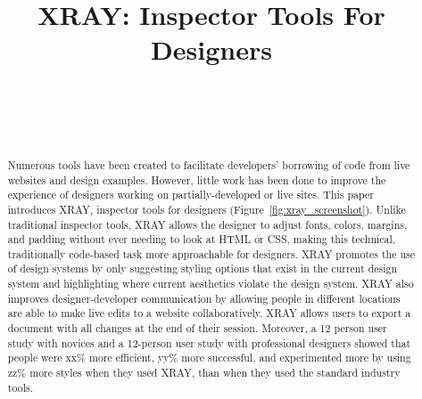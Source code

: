 \documentclass{sigchi}
\newcommand{\xray}{XRAY\xspace}
\def\plaintitle{XRAY: Inspector Tools For Designers}
\begin{document}
\title{\plaintitle}

\author{%
  \\
  \\
  \\
}

\maketitle

\begin{abstract}
Numerous tools have been created to facilitate developers' borrowing of code from live websites and design examples. However, little work has been done to improve the experience of designers working on partially-developed or live sites. This paper introduces \xray, inspector tools for designers (Figure~\ref{fig:xray_screenshot}). Unlike traditional inspector tools, \xray allows the designer to adjust fonts, colors, margins, and padding without ever needing to look at HTML or CSS, making this technical, traditionally code-based task more approachable for designers. \xray promotes the use of design systems by only suggesting styling options that exist in the current design system and highlighting where current aesthetics violate the design system. \xray also improves designer-developer communication by allowing people in different locations are able to make live edits to a website collaboratively. \xray allows users to export a document with all changes at the end of their session. 
Moreover, a 12 person user study with novices and a 12-person user study with professional designers showed that people were xx\% more efficient, yy\% more successful, and experimented more by using zz\% more styles when they used \xray, than when they used the standard industry tools. 
\end{abstract}
\end{document}
